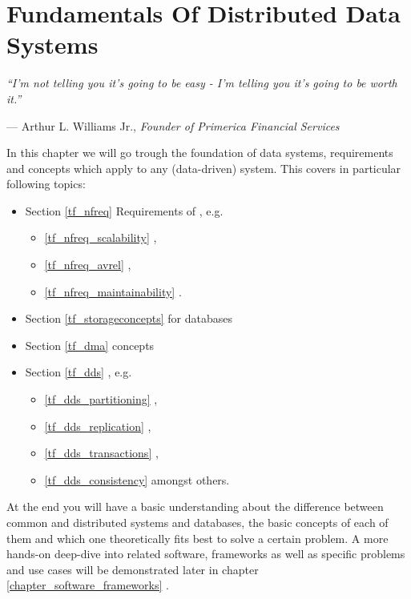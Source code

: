 \chapter{Fundamentals Of Distributed Data Systems}
\label{chapter_technical_foundation}
\setlength{\epigraphwidth}{0.95\textwidth}
\setlength\epigraphrule{0pt}
\epigraph{\itshape ``I'm not telling you it's going to be easy - I'm telling you it's going to be worth it.''}{--- Arthur L. Williams Jr., \textit{Founder of Primerica Financial Services}}

In this chapter we will go trough the foundation of data systems, requirements and concepts which apply to any (data-driven) system. This covers in particular following topics:
\begin{samepage}
\begin{itemize}
	\item Section \ref{tf_nfreq} Requirements of \textbf{}, e.g. 
		\begin{itemize}
			\item \ref{tf_nfreq_scalability} , 
			\item \ref{tf_nfreq_avrel} , 
			\item \ref{tf_nfreq_maintainability} .
		\end{itemize}
	\item Section \ref{tf_storageconcepts} \textbf{} for databases
	\item Section \ref{tf_dma} \textbf{} concepts
	\item Section \ref{tf_dds} \textbf{}, e.g.
		\begin{itemize}
			\item \ref{tf_dds_partitioning} , 
			\item \ref{tf_dds_replication} , 
			\item \ref{tf_dds_transactions} , 
			\item \ref{tf_dds_consistency}  amongst others.\\
		\end{itemize}
\end{itemize}
\end{samepage}

At the end you will have a basic understanding about the difference between common and distributed systems and databases, the basic concepts of each of them and which one theoretically fits best to solve a certain problem.
A more hands-on deep-dive into related software, frameworks as well as specific problems and use cases will be demonstrated later in chapter \ref{chapter_software_frameworks} .

